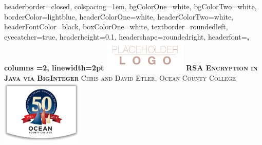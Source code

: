 \documentclass[landscape,fontscale=.4,paperwidth=48in,paperheight=36in]{baposter} %
\begin{document}
\begin{poster}
{
headerborder=closed, %
colspacing=1em, %
bgColorOne=white, %
bgColorTwo=white, %
borderColor=lightblue, %
headerColorOne=white, %
headerColorTwo=white, %
headerFontColor=black, %
boxColorOne=white, %
textborder=roundedleft, %
eyecatcher=true, %
headerheight=0.1\textheight, %
headershape=roundedright, %
headerfont=\Large\bf\textsc, %
columns =2,
linewidth=2pt %
}
%
{\includegraphics[height=4em]{logo.png}} %
{\bf\textsc{RSA Encryption in Java via BigInteger}\vspace{0.5em}} %
{\textsc{ Chris and David Etler,  \hspace{12pt} Ocean County College}} %
{\includegraphics[height=8em]{occ.png}} %


\end{poster}
\end{document}
